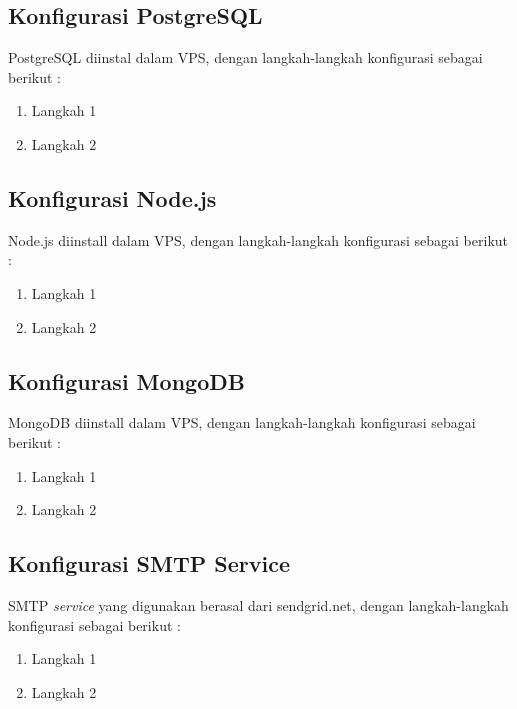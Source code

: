     \subsection{Konfigurasi PostgreSQL}
    PostgreSQL diinstal dalam VPS, dengan langkah-langkah konfigurasi sebagai berikut :
    \begin{enumerate}
    \item Langkah 1
    \item Langkah 2
    \end{enumerate}
    
    \subsection{Konfigurasi Node.js}
    Node.js diinstall dalam VPS, dengan langkah-langkah konfigurasi sebagai berikut :
    \begin{enumerate}
    \item Langkah 1
    \item Langkah 2
    \end{enumerate}
    
    \subsection{Konfigurasi MongoDB}
    MongoDB diinstall dalam VPS, dengan langkah-langkah konfigurasi sebagai berikut :
    \begin{enumerate}
    \item Langkah 1
    \item Langkah 2
    \end{enumerate}
    
    \subsection{Konfigurasi SMTP Service}
    SMTP \textit{service} yang digunakan berasal dari sendgrid.net, dengan langkah-langkah konfigurasi sebagai berikut :
    \begin{enumerate}
    \item Langkah 1
    \item Langkah 2
    \end{enumerate}
